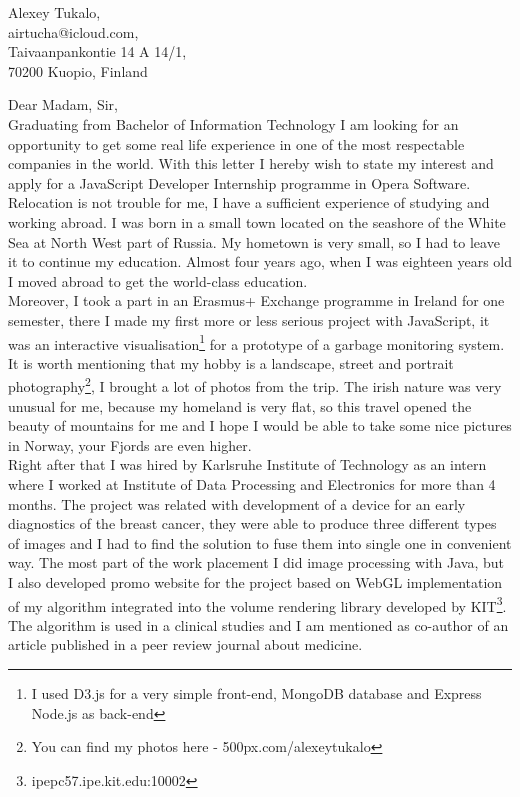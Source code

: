 \documentclass[english]{article}
\date{}
\begin{document}
\begin{flushright}
Alexey Tukalo,\\
airtucha@icloud.com,\\
Taivaanpankontie 14 A 14/1,\\
70200 Kuopio, Finland
\end{flushright}

Dear Madam, Sir,\\ 

Graduating from Bachelor of Information Technology I am looking for an opportunity to get some real life experience in one of the most respectable companies in the world. With this letter I hereby wish to state my interest and apply for a JavaScript Developer Internship programme in Opera Software.\\

Relocation is not trouble for me, I have a sufficient experience of studying and working abroad. I was born in a small town located on the seashore of the White Sea at North West part of Russia. My hometown is very small, so I had to leave it to continue my education. Almost four years ago, when I was eighteen years old I moved abroad to get the world-class education.\\

Moreover, I took a part in an Erasmus+ Exchange programme in Ireland for one semester, there I made my first more or less serious project with JavaScript, it was an interactive visualisation\footnote{I used D3.js for a very simple front-end, MongoDB database and Express Node.js as back-end} for a prototype of a garbage monitoring system. It is worth mentioning that my hobby is a landscape, street and portrait photography\footnote{You can find my photos here - 500px.com/alexeytukalo}, I brought a lot of photos from the trip. The irish nature was very unusual for me, because my homeland is very flat, so this travel opened the beauty of mountains for me and I hope I would be able to take some nice pictures in Norway, your Fjords are even higher.\\

Right after that I was hired by Karlsruhe Institute of Technology as an intern where I worked at Institute of Data Processing and Electronics for more than 4 months. The project was related with development of a device for an early diagnostics of the breast cancer, they were able to produce three different types of images and I had to find the solution to fuse them into single one in convenient way. The most part of the work placement I did image processing with Java, but I also developed promo website for the project based on WebGL implementation of my algorithm integrated into the volume rendering library developed by KIT\footnote{ipepc57.ipe.kit.edu:10002}. The algorithm is used in a clinical studies and I am mentioned as co-author of an article published in a peer review journal about medicine.\\
\end{document}

